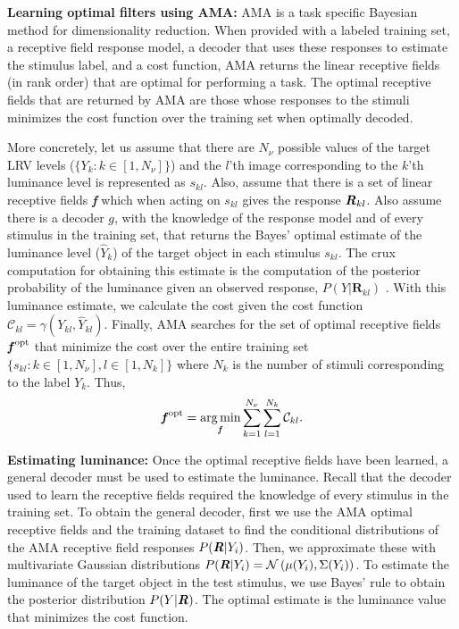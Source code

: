 \documentclass{jov}
\DeclareMathOperator*{\argmin}{arg\,min}
\begin{document}
{\bf Learning optimal filters using AMA:} AMA \cite{geisler2009optimal,burge2017accuracy,jaini2017linking}
is a task specific Bayesian method for dimensionality reduction. When provided with a labeled training set, a receptive field response model, a decoder that uses these responses to estimate the stimulus label, and a cost function, AMA returns the linear receptive fields (in rank order) that are optimal for performing a task. The optimal receptive fields that are returned by AMA are those whose responses to the stimuli minimizes the cost function over the training set when optimally decoded. 

More concretely, let us assume that there are $N_{\nu}$ possible values of the target LRV levels ($\{Y_k: k\in[1,N_{\nu}] \}$) and the $l$'th image corresponding to the $k$'th luminance level is represented as $s_{kl}$. Also, assume that there is a set of linear receptive fields {\textbf{\textit f}} which when acting on $s_{kl}$ gives the response ${\textbf{\textit R}}_{kl}$. Also assume there is a decoder $g$, with the knowledge of the response model and of every stimulus in the training set, that returns the Bayes' optimal estimate of the luminance level ($\hat{Y}_k$) of the target object in each stimulus $s_{kl}$. The crux computation for obtaining this estimate is the computation of the posterior probability of the luminance given an observed response, $P(Y|\textbf{R}_{kl})$ \cite{geisler2009optimal,burge2017accuracy,jaini2017linking}
. With this luminance estimate, we calculate the cost given the cost function $\mathcal{C}_{kl} = \gamma(Y_{kl},\hat{Y}_{kl})$. Finally, AMA searches for the set of optimal receptive fields ${\textbf{\textit f}}^{\rm opt}$ that minimize the cost over the entire training set $\{s_{kl}: k\in[1,N_{\nu}], l\in[1,N_k]\}$ where $N_{k}$ is the number of stimuli corresponding to the label $Y_k$. Thus,
\begin{align}
{\textbf {\textit f} }^{\rm opt} = \argmin_{\textbf {\textit f} } \sum_{k=1}^{N_{\nu}}  \sum_{l=1}^{N_k} {\mathcal{C}}_{kl}.
\label{eq:fopt}
\end{align}

{\bf Estimating luminance:} 
Once the optimal receptive fields have been learned, a general decoder must be used to estimate the luminance. Recall that the decoder used to learn the receptive fields required the knowledge of every stimulus in the training set. To obtain the general decoder, first we use the AMA optimal receptive fields and the training dataset to find the conditional distributions of the AMA receptive field responses $P({\textbf {\textit R} }|Y_i)$. Then, we approximate these with multivariate Gaussian distributions $P({\textbf {\textit R} }|Y_i) = \mathcal{N}\left(\mu(Y_i),\Sigma(Y_i) \right)$. To estimate the luminance of the target object in the test stimulus, we use Bayes' rule to obtain the posterior distribution $P(Y|{\textbf {\textit R} })$. The optimal estimate is the luminance value that minimizes the cost function.
\end{document}
